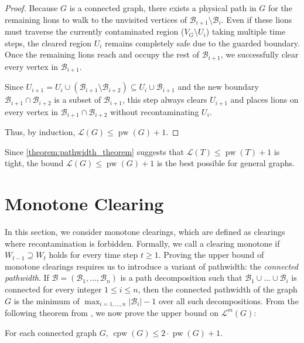 \documentclass[a4paper,UKenglish,cleveref, autoref, thm-restate]{lipics-v2021}
\begin{document}
\begin{proof}
Because $G$ is a connected graph, there exists a physical path in $G$ for the remaining lions to walk to the unvisited vertices of $\mathcal{B}_{i+1} \setminus \mathcal{B}_i$. Even if these lions must traverse the currently contaminated region ($V_G \setminus U_i$) taking multiple time steps, the cleared region $U_i$ remains completely safe due to the guarded boundary. Once the remaining lions reach and occupy the rest of $\mathcal{B}_{i+1}$, we successfully clear every vertex in $\mathcal{B}_{i+1}$.

Since $U_{i+1} = U_i \cup (\mathcal{B}_{i+1} \setminus \mathcal{B}_{i+2}) \subseteq U_i \cup \mathcal{B}_{i+1}$ and the new boundary $\mathcal{B}_{i+1} \cap \mathcal{B}_{i+2}$ is a subset of $\mathcal{B}_{i+1}$, this step always clears $U_{i+1}$ and places lions on every vertex in $\mathcal{B}_{i+1} \cap \mathcal{B}_{i+2}$ without recontaminating $U_i$.

Thus, by induction, $\mathcal{L}(G) \leq \operatorname{pw}(G)+1$.
\end{proof}

\begin{remark}
Since \cref{theorem:pathwidth_theorem} suggests that $\mathcal{L}(T) \leq \operatorname{pw}(T)+1$ is tight, the bound $\mathcal{L}(G) \leq \operatorname{pw}(G)+1$ is the best possible for general graphs.
\end{remark}

\section{Monotone Clearing}\label{sec:monotone_clearing}
In this section, we consider monotone clearings, which are defined as clearings where recontamination is forbidden. Formally, we call a clearing monotone if $W_{t-1}\supseteq W_{t}$ holds for every time step $t\geq 1$. Proving the upper bound of monotone clearings requires us to introduce a variant of pathwidth: the \emph{connected pathwidth}. If $\mathcal{B}=(\mathcal{B}_1, \dots, \mathcal{B}_n)$ is a path decomposition such that $\mathcal{B}_1 \cup \dots \cup \mathcal{B}_i$ is connected for every integer $1\leq i\leq n$, then the connected pathwidth of the graph $G$ is the minimum of $\max_{i=1,\dots,n}|\mathcal{B}_i| - 1$ over all such decompositions. From the following theorem from \cite{dereniowski2012pathwidth}, we now prove the upper bound on $\mathcal{L}^m(G)$:

\begin{lemma}\label{lemma:connected_pathwidth_lemma}
For each connected graph $G$, $\operatorname{cpw}(G)\leq 2\cdot \operatorname{pw}(G) + 1$.
\end{lemma}
\end{document}
